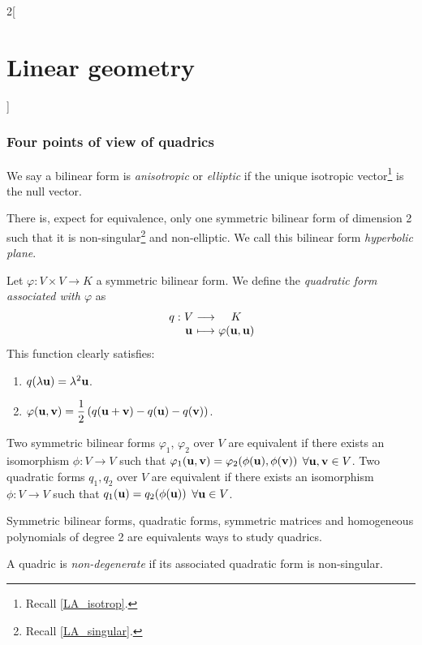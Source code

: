 \documentclass[../../../main.tex]{subfiles}
\begin{document}
\begin{multicols}{2}[\section{Linear geometry}]
    \subsubsection{Four points of view of quadrics}
    \begin{definition}
        We say a bilinear form is \textit{anisotropic} or \textit{elliptic} if the unique isotropic vector\footnote{Recall \cref{LA_isotrop}.} is the null vector.
    \end{definition}
    \begin{theorem}
        There is, expect for equivalence, only one symmetric bilinear form of dimension 2 such that it is non-singular\footnote{Recall \cref{LA_singular}.} and non-elliptic. We call this bilinear form \textit{hyperbolic plane}.
    \end{theorem}
    \begin{definition}
        Let $\varphi:V\times V\rightarrow K$ a symmetric bilinear form. We define the \textit{quadratic form associated with $\varphi$} as
        $$
            \function{q}{V}{K}{\vf{u}}{\varphi(\vf{u},\vf{u})}
        $$
        This function clearly satisfies:
        \begin{enumerate}
            \item $q(\lambda\boldsymbol{\mathrm{u}})=\lambda^2\boldsymbol{\mathrm{u}}$.
            \item $\displaystyle\varphi(\boldsymbol{\mathrm{u}},\boldsymbol{\mathrm{v}})=\frac{1}{2}\left(q(\boldsymbol{\mathrm{u}}+\boldsymbol{\mathrm{v}})-q(\boldsymbol{\mathrm{u}})-q(\boldsymbol{\mathrm{v}})\right)$.
        \end{enumerate}
    \end{definition}
    \begin{prop}
        Two symmetric bilinear forms $\varphi_1$, $\varphi_2$ over $V$ are equivalent if there exists an isomorphism $\phi:V\rightarrow V$ such that $\varphi_1(\boldsymbol{\mathrm{u}},\boldsymbol{\mathrm{v}})=\varphi_2(\phi(\boldsymbol{\mathrm{u}}),\phi(\boldsymbol{\mathrm{v}}))$ $\forall\boldsymbol{\mathrm{u}},\boldsymbol{\mathrm{v}}\in V$.\newline
        Two quadratic forms $q_1,q_2$ over $V$ are equivalent if there exists an isomorphism $\phi:V\rightarrow V$ such that $q_1(\boldsymbol{\mathrm{u}})=q_2(\phi(\boldsymbol{\mathrm{u}}))$ $\forall\boldsymbol{\mathrm{u}}\in V$.
    \end{prop}
    \begin{theorem}
        Symmetric bilinear forms, quadratic forms, symmetric matrices and homogeneous polynomials of degree 2 are equivalents ways to study quadrics.
    \end{theorem}
    \begin{definition}
        A quadric is \textit{non-degenerate} if its associated quadratic form is non-singular.
    \end{definition}

\end{multicols}
\end{document}
